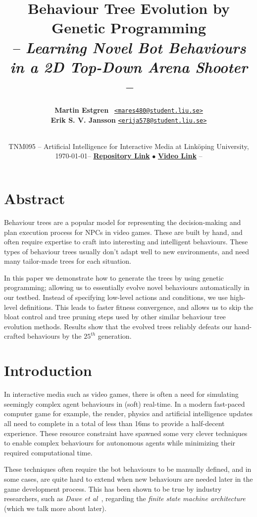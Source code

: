 \documentclass[a4paper, twocolumn]{article}
\title{\textbf{Behaviour Tree Evolution by Genetic Programming}\\
       \Large{\emph{-- Learning Novel Bot Behaviours in a 2D Top-Down Arena Shooter --}}}
\date{
TNM095 -- Artificial Intelligence for Interactive Media\endgraf
at Linköping University, \today\endgraf\bigskip --
\href{https://github.com/sci10n/Quake2D}{\textbf{Repository Link}}
$\bullet$
\href{https://vimeo.com/242262802}{\textbf{Video Link}} --
}
\author{{\textbf{Martin Estgren}} \;\;\;\;\;\;\;\;\;\, {\href{mailto:mares480@student.liu.se}
                                                       {\texttt{<mares480@student.liu.se>}}} \\
        {\textbf{Erik S. V. Jansson}} \;\;\;\;         {\href{mailto:erija578@student.liu.se}
                                                       {\texttt{<erija578@student.liu.se>}}} \\~\\
        \vspace{-5.0ex}}
\begin{document}
    \maketitle
    

    \section*{Abstract}

    Behaviour trees are a popular model for representing the decision-making and plan execution process for NPCs in video games. These are built by hand, and often require expertise to craft into interesting and intelligent behaviours. These types of behaviour trees usually don't adapt well to new environments, and need many tailor-made trees for each situation.

    In this paper we demonstrate how to generate the trees by using genetic programming; allowing us to essentially evolve novel behaviours automatically in our testbed. Instead of specifying low-level actions and conditions, we use high-level definitions. This leads to faster fitness convergence, and allows us to skip the bloat control and tree pruning steps used by other similar behaviour tree evolution methods. Results show that the evolved trees reliably defeats our hand-crafted behaviours by the \(25^{th}\) generation.

    \vspace{1em}

    \begingroup
    \def\addvspace#1{}
    \tableofcontents
    \endgroup

    \section{Introduction} \label{sec:introduction}

    In interactive media such as video games, there is often a need for simulating seemingly complex agent behaviours in (soft) real-time. In a modern fast-paced computer game for example, the render, physics and artificial intelligence updates all need to complete in a total of less than 16ms to provide a half-decent experience. These resource constraint have spawned some very clever techniques to enable complex behaviours for autonomous agents while minimizing their required computational time.

    These techniques often require the bot behaviours to be manually defined, and in some cases, are quite hard to extend when new behaviours are needed later in the game development process. This has been shown to be true by industry researchers, such as \emph{Dawe et al}~\cite{dawe2014overview}, regarding the \emph{finite state machine architecture} (which we talk more about later).
\end{document}
